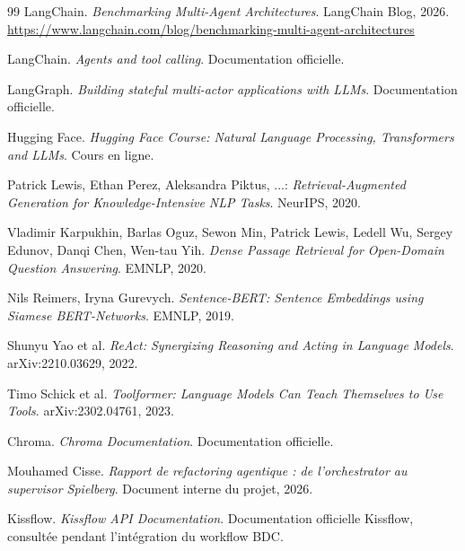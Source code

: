 \documentclass[a4paper,11pt,english,openany]{book}
\begin{document}
\begin{thebibliography}{99}
LangChain.
\textit{Benchmarking Multi-Agent Architectures}.
LangChain Blog, 2026.
\url{https://www.langchain.com/blog/benchmarking-multi-agent-architectures}

LangChain.
\textit{Agents and tool calling}.
Documentation officielle.

LangGraph.
\textit{Building stateful multi-actor applications with LLMs}.
Documentation officielle.

Hugging Face.
\textit{Hugging Face Course: Natural Language Processing, Transformers and LLMs}.
Cours en ligne.

Patrick Lewis, Ethan Perez, Aleksandra Piktus, ...:
\textit{Retrieval-Augmented Generation for Knowledge-Intensive NLP Tasks}.
NeurIPS, 2020.

Vladimir Karpukhin, Barlas Oguz, Sewon Min, Patrick Lewis, Ledell Wu, Sergey Edunov, Danqi Chen, Wen-tau Yih.
\textit{Dense Passage Retrieval for Open-Domain Question Answering}.
EMNLP, 2020.

Nils Reimers, Iryna Gurevych.
\textit{Sentence-BERT: Sentence Embeddings using Siamese BERT-Networks}.
EMNLP, 2019.

Shunyu Yao et al.
\textit{ReAct: Synergizing Reasoning and Acting in Language Models}.
arXiv:2210.03629, 2022.

Timo Schick et al.
\textit{Toolformer: Language Models Can Teach Themselves to Use Tools}.
arXiv:2302.04761, 2023.

Chroma.
\textit{Chroma Documentation}.
Documentation officielle.

Mouhamed Cisse.
\textit{Rapport de refactoring agentique : de l'orchestrator au supervisor Spielberg}.
Document interne du projet, 2026.

Kissflow.
\textit{Kissflow API Documentation}.
Documentation officielle Kissflow, consultée pendant l'intégration du workflow BDC.
\end{thebibliography}
\end{document}
